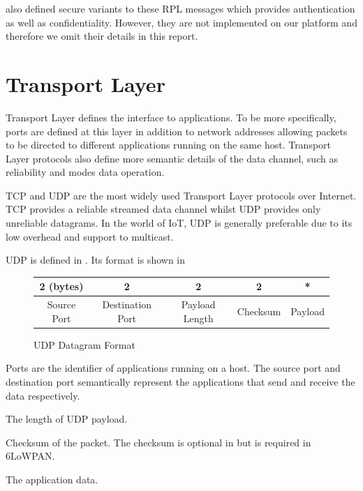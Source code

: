 \cite{rfc6550} also defined secure variants to these RPL messages which provides authentication as well as confidentiality. However, they are not implemented on our platform and therefore we omit their details in this report.

\section{Transport Layer} \label{Sec: Transportation Layer}
Transport Layer defines the interface to applications. To be more specifically, ports are defined at this layer in addition to network addresses allowing packets to be directed to different applications running on the same host. Transport Layer protocols also define more semantic details of the data channel, such as reliability and modes data operation.

TCP and UDP are the most widely used Transport Layer protocols over Internet. TCP provides a reliable streamed data channel whilst UDP provides only unreliable datagrams. In the world of IoT, UDP is generally preferable due to its low overhead and support to multicast.

UDP is defined in \cite{rfc768}. Its format is shown in 
\begin{figure}[h!]
	\center
	\begin{tabular}{|c|c|c|c|c|}
		\hline
		2 (bytes)   & 2                & 2              & 2        & *       \\ \hline
		Source Port & Destination Port & Payload Length & Checksum & Payload \\ \hline
	\end{tabular}
	\caption{UDP Datagram Format}
	\label{Fig: UDP Datagram Format}
\end{figure}

\begin{description}[style=nextline]
	\item[\textbf{Source and Destination Port}]
	Ports are the identifier of applications running on a host. The source port and destination port semantically represent the applications that send and receive the data respectively.
	\item[\textbf{Payload Length}]
	The length of UDP payload.
	\item[\textbf{Checksum}]
	Checksum of the packet. The checksum is optional in \cite{rfc768} but is required in 6LoWPAN.
	\item[\textbf{Payload}]
	The application data.
\end{description}

